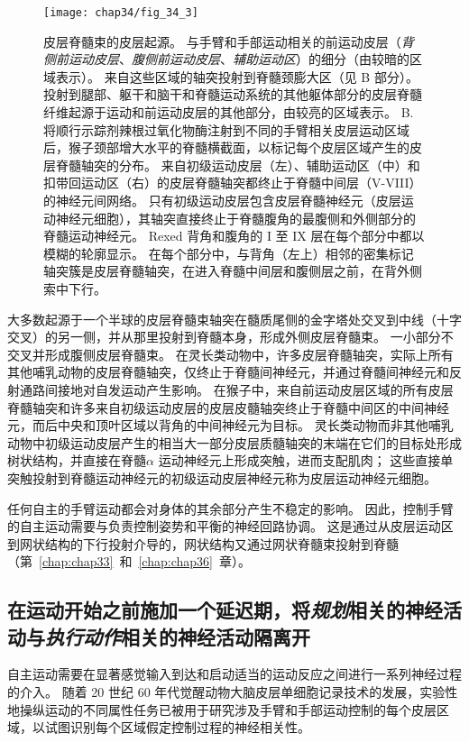 \begin{figure}[htbp]
	\centering
	\texttt{[image: chap34/fig\_34\_3]}
	\caption{皮层脊髓束的皮层起源。 
		与手臂和手部运动相关的前运动皮层（\textit{背侧前运动皮层}、\textit{腹侧前运动皮层}、\textit{辅助运动区}）的细分（由较暗的区域表示）。
		来自这些区域的轴突投射到脊髓颈膨大区（见 B 部分）。
		投射到腿部、躯干和脑干和脊髓运动系统的其他躯体部分的皮层脊髓纤维起源于运动和前运动皮层的其他部分，由较亮的区域表示。 
		B. 将顺行示踪剂辣根过氧化物酶注射到不同的手臂相关皮层运动区域后，猴子颈部增大水平的脊髓横截面，以标记每个皮层区域产生的皮层脊髓轴突的分布。
		来自初级运动皮层（左）、辅助运动区（中）和扣带回运动区（右）的皮层脊髓轴突都终止于脊髓中间层（V-VIII）的神经元间网络。
		只有初级运动皮层包含皮层脊髓神经元（皮层运动神经元细胞），其轴突直接终止于脊髓腹角的最腹侧和外侧部分的脊髓运动神经元。
		Rexed 背角和腹角的 I 至 IX 层在每个部分中都以模糊的轮廓显示。
		在每个部分中，与背角（左上）相邻的密集标记轴突簇是皮层脊髓轴突，在进入脊髓中间层和腹侧层之前，在背外侧索中下行。}
	\label{fig:34_3}
\end{figure}


大多数起源于一个半球的皮层脊髓束轴突在髓质尾侧的金字塔处交叉到中线（十字交叉）的另一侧，并从那里投射到脊髓本身，形成外侧皮层脊髓束。
一小部分不交叉并形成腹侧皮层脊髓束。
在灵长类动物中，许多皮层脊髓轴突，实际上所有其他哺乳动物的皮层脊髓轴突，仅终止于脊髓间神经元，并通过脊髓间神经元和反射通路间接地对自发运动产生影响。
在猴子中，来自前运动皮层区域的所有皮层脊髓轴突和许多来自初级运动皮层的皮层皮髓轴突终止于脊髓中间区的中间神经元，而后中央和顶叶区域以背角的中间神经元为目标。
灵长类动物而非其他哺乳动物中初级运动皮层产生的相当大一部分皮层质髓轴突的末端在它们的目标处形成树状结构，并直接在脊髓$ \alpha $ 运动神经元上形成突触，进而支配肌肉；
这些直接单突触投射到脊髓运动神经元的初级运动皮层神经元称为皮层运动神经元细胞。


任何自主的手臂运动都会对身体的其余部分产生不稳定的影响。
因此，控制手臂的自主运动需要与负责控制姿势和平衡的神经回路协调。
这是通过从皮层运动区到网状结构的下行投射介导的，网状结构又通过网状脊髓束投射到脊髓（第~\ref{chap:chap33}~和~\ref{chap:chap36}~章）。



\subsection{在运动开始之前施加一个延迟期，将\textit{规划}相关的神经活动与\textit{执行动作}相关的神经活动隔离开}


自主运动需要在显著感觉输入到达和启动适当的运动反应之间进行一系列神经过程的介入。
随着 20 世纪 60 年代觉醒动物大脑皮层单细胞记录技术的发展，实验性地操纵运动的不同属性任务已被用于研究涉及手臂和手部运动控制的每个皮层区域，以试图识别每个区域假定控制过程的神经相关性。


